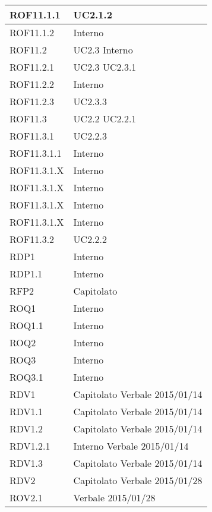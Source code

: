 \begin{center}
\begin{longtable}{| p{4cm} | p{4cm} |}
ROF11.1.1   &  UC2.1.2 \\
\hline
ROF11.1.2   &  Interno \\
\hline
ROF11.2   &  UC2.3 \newline Interno \\
\hline
ROF11.2.1   &  UC2.3 \newline UC2.3.1 \\
\hline
ROF11.2.2   &  Interno \\
\hline
ROF11.2.3   &  UC2.3.3 \\
\hline
ROF11.3   &  UC2.2 \newline UC2.2.1 \\
\hline
ROF11.3.1   &  UC2.2.3 \\
\hline
ROF11.3.1.1   &  Interno \\
\hline
ROF11.3.1.X   &  Interno \\
\hline
ROF11.3.1.X   &  Interno \\
\hline
ROF11.3.1.X   &  Interno \\
\hline
ROF11.3.1.X   &  Interno \\
\hline
ROF11.3.2   &  UC2.2.2 \\
\hline
RDP1   &  Interno \\
\hline
RDP1.1   &  Interno \\
\hline
RFP2   &  Capitolato \\
\hline
ROQ1   &  Interno \\
\hline
ROQ1.1   &  Interno \\
\hline
ROQ2   &  Interno \\
\hline
ROQ3   &  Interno \\
\hline
ROQ3.1   &  Interno \\
\hline
RDV1   &  Capitolato \newline Verbale 2015/01/14 \\
\hline
RDV1.1   &  Capitolato \newline Verbale 2015/01/14 \\
\hline
RDV1.2   &  Capitolato \newline Verbale 2015/01/14 \\
\hline
RDV1.2.1   &  Interno \newline Verbale 2015/01/14 \\
\hline
RDV1.3   &  Capitolato \newline Verbale 2015/01/14 \\
\hline
RDV2   &  Capitolato \newline Verbale 2015/01/28 \\
\hline
ROV2.1   &  Verbale 2015/01/28 \\

\end{longtable}
\end{center}
